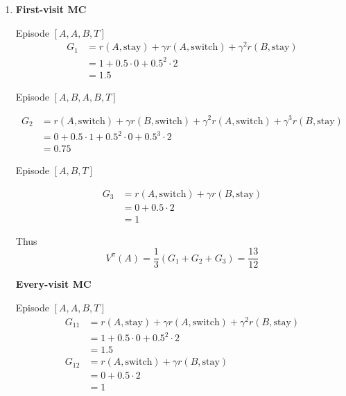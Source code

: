 \begin{Solution}
\begin{enumerate} [label=\alph*)]
        \item
        \textbf{First-visit MC}
        
        Episode $[A, A, B, T]$
        $$
        \begin{aligned}
        G_1 & = r(A,\text{stay}) + \gamma r(A,\text{switch}) + \gamma^2 r(B,\text{stay}) \\
        & = 1 + 0.5 \cdot 0 + 0.5^2 \cdot 2 \\
        & = 1.5
        \end{aligned}
        $$
        
        Episode $[A, B, A, B, T]$
        
        $$
        \begin{aligned}
        G_2 & = r(A,\text{switch}) + \gamma r(B,\text{switch}) + \gamma^2 r(A,\text{switch}) + \gamma^3 r(B,\text{stay}) \\
        & = 0 + 0.5 \cdot 1 + 0.5^2 \cdot 0 + 0.5^3 \cdot 2 \\
        & = 0.75
        \end{aligned}
        $$

        Episode $[A, B, T]$
        
        $$
        \begin{aligned}
        G_3 & = r(A,\text{switch}) + \gamma r(B,\text{stay}) \\
        & = 0 + 0.5 \cdot 2 \\
        & = 1
        \end{aligned}
        $$
        
        Thus
        $$
        V^\pi(A) = \dfrac{1}{3} (G_1 + G_2 + G_3) = \dfrac{13}{12}
        $$
        
        \vspace{1em}
        \textbf{Every-visit MC}
        
        Episode $[A, A, B, T]$
        $$
        \begin{aligned}
        G_{11} & = r(A,\text{stay}) + \gamma r(A,\text{switch}) + \gamma^2 r(B,\text{stay}) \\
        & = 1 + 0.5 \cdot 0 + 0.5^2 \cdot 2 \\
        & = 1.5 \\
        G_{12} & = r(A,\text{switch}) + \gamma r(B,\text{stay}) \\
        & = 0 + 0.5 \cdot 2 \\
        & = 1
        \end{aligned}
        $$
        

\end{enumerate}
\end{Solution}
